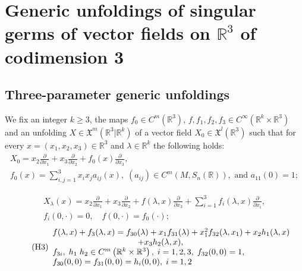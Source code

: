 \documentclass[12pt]{article}
\newtheorem{remark definition}{Remark Definition}[section]
\begin{document}
	\section{Generic unfoldings of singular germs of vector fields on $\mathbb{R}^3$ of codimension 3}\label{Sect3_GPU}
	\subsection{Three-parameter generic unfoldings}
We fix an integer $k\geq 3$,  the maps $f_0\in C^m(\mathbb{R}^3)$, $f, f_1,f_2,f_3\in C^{\infty}( \mathbb{R}^k\times\mathbb{R}^3)$ and an unfolding $X\in \mathfrak{X}^m (\mathbb{R}^3\vert \mathbb{R}^k )$ of a vector field $X_0 \in \mathfrak{X}^l (\mathbb{R}^3)$ such that  for every $x=(x_1 , x_2 , x_3 )\in \mathbb{R}^3$ and $\lambda\in \mathbb{R}^k$ the following holds: 
\begin{equation}\label{GSUH1}\tag{H1}
\begin{array}{l}
X_0=x_2\frac{\partial}{\partial x_1}+x_3\frac{\partial}{\partial x_2} + f_0 (x)\frac{\partial}{\partial x_3},
 \\f_0(x) = \sum_{i,j=1}^{3} x_i x_j a_{ij}(x),\; (a_{ij})\in C^m(M, S_n(\mathbb{R})),\mbox{ and } a_{11}(0)=1;
\end{array}
\end{equation}

\begin{equation}\label{GSUH2}\tag{H2}
\begin{array}{l}
X_\lambda (x)= x_2 \frac{\partial}{\partial x_1}+x_3 \frac{\partial}{\partial x_2} + f(\lambda,x)\frac{\partial}{\partial x_3}+\sum_{i=1}^{3} f_i(\lambda,x)\frac{\partial}{\partial x_i}, \\f_i (0, \cdot )=0,\quad f (0, \cdot )=f_0(\cdot);
\end{array}
\end{equation}		
\begin{equation}\label{GSUH3}\tag{H3}
\begin{array}{l}f (\lambda , x)+ f_3 (\lambda , x) = f_{30} (\lambda)+x_1 f_{31}(\lambda ) + x_{1}^{2}f_{32}(\lambda ,x_1)+x_2 h_1 (\lambda , x)\\
\hspace{3.6cm}+ x_3 h_2 (\lambda ,x ),\\ 
f_{3i},\; h_1\; h_2\in C^m\left(\mathbb{R}^k\times\mathbb{R}^3\right),\;  i=1,2,3,\;f_{32} (0,0)=1,\\  f_{30}(0,0) = f_{3 1}(0,0) =h_i (0,0),\; i=1,2\end{array}
\end{equation}
\end{document}
